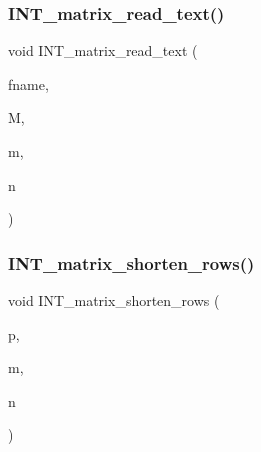\subsubsection{\texorpdfstring{I\+N\+T\+\_\+matrix\+\_\+read\+\_\+text()}{INT\_matrix\_read\_text()}}
{\footnotesize\ttfamily void I\+N\+T\+\_\+matrix\+\_\+read\+\_\+text (\begin{DoxyParamCaption}\item[{const \mbox{\hyperlink{galois_8h_ab6cc7b4aeb6ea31aba2b3fbfc83ff5e6}{B\+Y\+TE}} $\ast$}]{fname,  }\item[{\mbox{\hyperlink{galois_8h_a09fddde158a3a20bd2dcadb609de11dc}{I\+NT}} $\ast$\&}]{M,  }\item[{\mbox{\hyperlink{galois_8h_a09fddde158a3a20bd2dcadb609de11dc}{I\+NT}} \&}]{m,  }\item[{\mbox{\hyperlink{galois_8h_a09fddde158a3a20bd2dcadb609de11dc}{I\+NT}} \&}]{n }\end{DoxyParamCaption})}

\mbox{\label{util_8_c_acdd91c1bc2dbbb55fca4f3a091ecbba5}} 
\subsubsection{\texorpdfstring{I\+N\+T\+\_\+matrix\+\_\+shorten\+\_\+rows()}{INT\_matrix\_shorten\_rows()}}
{\footnotesize\ttfamily void I\+N\+T\+\_\+matrix\+\_\+shorten\+\_\+rows (\begin{DoxyParamCaption}\item[{\mbox{\hyperlink{galois_8h_a09fddde158a3a20bd2dcadb609de11dc}{I\+NT}} $\ast$\&}]{p,  }\item[{\mbox{\hyperlink{galois_8h_a09fddde158a3a20bd2dcadb609de11dc}{I\+NT}}}]{m,  }\item[{\mbox{\hyperlink{galois_8h_a09fddde158a3a20bd2dcadb609de11dc}{I\+NT}}}]{n }\end{DoxyParamCaption})}

\mbox{\label{util_8_c_a1ed4962965eb4509c5699955af7bc0f0}} 
